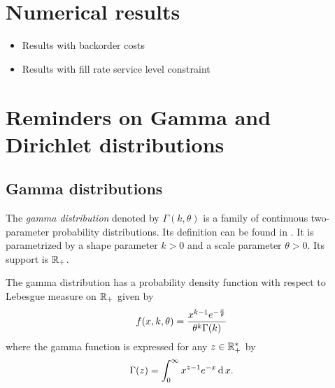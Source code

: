 



\section{Numerical results}



\begin{itemize}
  \item Results with backorder costs
  \item Results with fill rate service level constraint
\end{itemize}




\section{Reminders on Gamma and Dirichlet distributions}
\label{sec:reminders:gamma-and-dirichlet-distributions}



\subsection{Gamma distributions}

The \emph{gamma distribution} denoted by $\Gamma(k,\theta)$ is a family of continuous two-parameter probability distributions.
Its definition can be found in \cite[Appendix A]{Delmas2006}.
It is parametrized by a shape parameter $k>0$ and a scale parameter $\theta>0$.
Its support is $\mathbb{R}_+$.

The gamma distribution has a probability density function with respect to Lebesgue measure on $\mathbb{R}_+$ given by
\begin{equation}\label{eq:dirchlet:probability-density-function}
  f\bracket{x,k,\theta} = \frac{x^{k-1}e^{-\frac{x}{\theta}}}{ \theta^k\Gamma\bracket{k} }
\end{equation}
where the gamma function is expressed for any $z\in\mathbb{R}_+^*$ by
\begin{equation}
  \Gamma\bracket{z} = \int_0^{\infty} x^{z-1}e^{-x} \diff x.
\end{equation}


